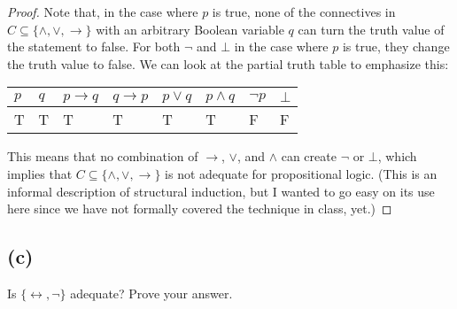 \documentclass[12pt,leqno,fleqn]{article}
\begin{document}
\begin{proof}
    \noindent Note that, in the case where $p$ is true, none of the connectives in $C \subseteq \{\land, \lor, \to\}$ with an arbitrary Boolean variable $q$ can turn the truth value of the statement to false.  For both $\neg$ and $\bot$ in the case where $p$ is true, they change the truth value to false.  We can look at the partial truth table to emphasize this:  

    \begin{tabular}{ll|l|l|l|l|l|l}
        $p$ & $q$ & $p \to q$ & $q \to p$ & $p \lor q$ & $p \land q$ & $\neg p$ & $\bot$ \\ \hline 
        T   & T   & T         & T         & T          & T           & F        & F \\
    \end{tabular}
    
    \noindent This means that no combination of $\to$, $\lor$, and $\land$ can create $\neg$ or $\bot$, which implies that $C \subseteq \{\land, \lor, \to\}$ is not adequate for propositional logic. (This is an informal description of structural induction, but I wanted to go easy on its use here since we have not formally covered the technique in class, yet.) 
    
\end{proof}

\subsection*{(c)}

Is $\{\leftrightarrow, \neg\}$ adequate?  Prove your answer.  
\end{document}
